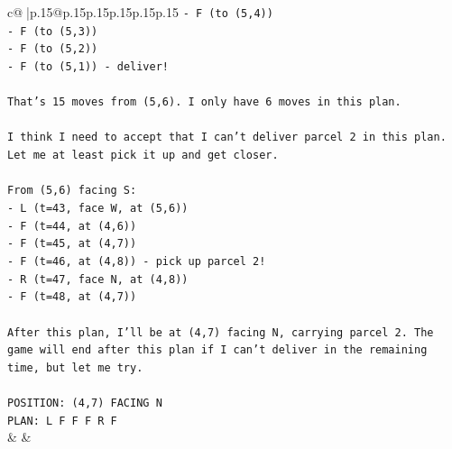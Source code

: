 \documentclass{article}
\begin{document}
{\begin{supertabular}{c@{$\;$}|p{.15\linewidth}@{}p{.15\linewidth}p{.15\linewidth}p{.15\linewidth}p{.15\linewidth}p{.15\linewidth}}
{{{\texttt{{-} F (to (5,4))} \\
\texttt{{-} F (to (5,3))} \\
\texttt{{-} F (to (5,2))} \\
\texttt{{-} F (to (5,1)) {-} deliver!} \\
\\ 
\texttt{That's 15 moves from (5,6). I only have 6 moves in this plan.} \\
\\ 
\texttt{I think I need to accept that I can't deliver parcel 2 in this plan. Let me at least pick it up and get closer.} \\
\\ 
\texttt{From (5,6) facing S:} \\
\texttt{{-} L (t=43, face W, at (5,6))} \\
\texttt{{-} F (t=44, at (4,6))} \\
\texttt{{-} F (t=45, at (4,7))} \\
\texttt{{-} F (t=46, at (4,8)) {-} pick up parcel 2!} \\
\texttt{{-} R (t=47, face N, at (4,8))} \\
\texttt{{-} F (t=48, at (4,7))} \\
\\ 
\texttt{After this plan, I'll be at (4,7) facing N, carrying parcel 2. The game will end after this plan if I can't deliver in the remaining time, but let me try.} \\
\\ 
\texttt{POSITION: (4,7) FACING N} \\
\texttt{PLAN: L F F F R F} \\
            }
        }
    }
    & & \\ \\


\end{supertabular}}
\end{document}
